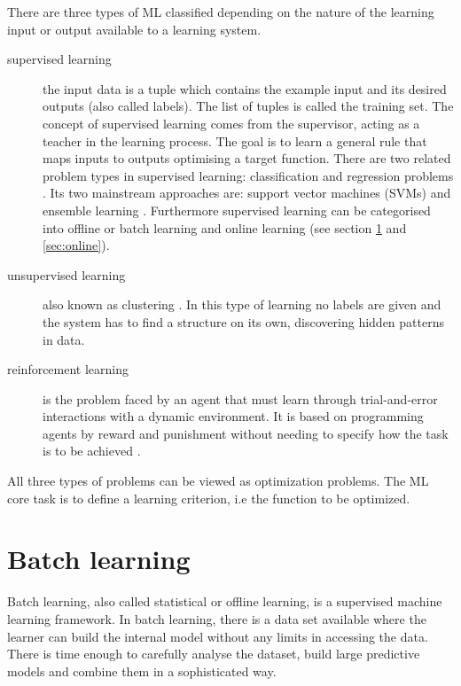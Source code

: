 There are three types of ML classified depending on the nature of the learning input or output available to a learning system.
\begin{description}
\item[supervised learning]  the input data is a tuple which contains the example input and its desired outputs (also called labels). The list of tuples is called the training set. The concept of supervised learning comes from the supervisor, acting as a teacher in the learning process. The goal is to learn a general rule that maps inputs to outputs optimising a target function. There are two related problem types in supervised learning: classification and regression problems \cite{bishop2006}. Its two mainstream approaches are: support vector machines (SVMs) \cite{vapnik1998} and ensemble learning \cite{breiman1998}. Furthermore supervised learning can be categorised into offline or batch learning and online learning (see section \ref{sec:batch} and \ref{sec:online}). 
\item[unsupervised learning] also known as clustering \cite{ben2005}. In this type of learning no labels are given and the system has to find a structure on its own, discovering hidden patterns in data.
\item[reinforcement learning] is the problem faced by an agent that must learn 
through trial-and-error interactions with a dynamic environment. It is based on programming agents by reward and punishment without needing to specify how the task is to be achieved \cite{sutton1998}.
\end{description}

All three types of problems can be viewed as optimization problems. The ML core task is to define a learning criterion, i.e the function to be optimized. 

\section{Batch learning} \label{sec:batch}

Batch learning, also called statistical or offline learning, is a supervised machine learning framework. In batch learning, there is a data set available where the learner can build the internal model without any limits in accessing the data. There is time enough to carefully analyse the dataset, build large predictive models and combine them in a sophisticated way. 



